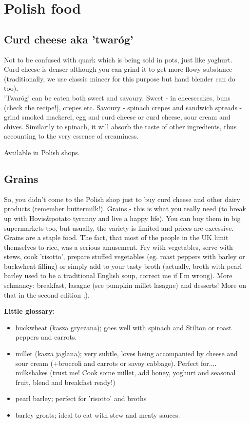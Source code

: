 \section*{Polish food}

\subsection*{Curd cheese aka 'twaróg'}

Not to be confused with quark which is being sold in pots, just like yoghurt.\\
Curd cheese is denser although you can grind it to get more flowy substance (traditionally, we use classic mincer for this purpose but hand blender can do too).\\
'Twaróg' can be eaten both sweet and savoury. Sweet - in cheesecakes, buns (check the recipe!), crepes etc. Savoury - spinach crepes and sandwich spreads - grind smoked mackerel, egg and curd cheese or curd cheese, sour cream and chives.
Similarily to spinach, it will absorb the taste of other ingredients, thus accounting to the very essence of creaminess.

Available in Polish shops.

\subsection*{Grains}
So, you didn't come to the Polish shop just to buy curd cheese and other dairy products (remember buttermilk!).
Grains - this is what you really need (to break up with Hovis\&potato tyranny and live a happy life).
You can buy them in big supermarkets too, but usually, the variety is limited and prices are excessive.\\
Grains are a staple food. The fact, that most of the people in the UK limit themselves to rice, was a serious amusement. Fry with vegetables, serve with stews, cook 'risotto', prepare stuffed vegetables (eg. roast peppers with barley or buckwheat filling) or simply add to your tasty broth (actually, broth with pearl barley used to be a traditional English soup, correct me if I'm wrong). More schmancy: breakfast, lasagne (see pumpkin millet lasagne) and desserts! More on that in the second edition ;).

\textbf{Little glossary:}
\begin{itemize}
    \setlength\itemsep{0.1mm}
    \item buckwheat (kasza gryczana); goes well with spinach and Stilton or roast peppers and carrots. 
    \item millet (kasza jaglana); very subtle, loves being accompanied by cheese and sour cream (+broccoli and carrots or savoy cabbage). Perfect for.... milkshakes (trust me! Cook some millet, add honey, yoghurt and seasonal fruit, blend and breakfast ready!) 
    \item pearl barley; perfect for 'risotto' and broths
    \item barley groats; ideal to eat with stew and meaty sauces. 
\end{itemize}

